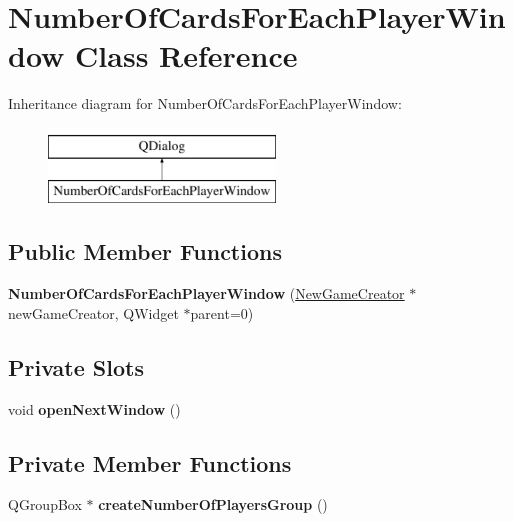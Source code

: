 \hypertarget{classNumberOfCardsForEachPlayerWindow}{}\section{Number\+Of\+Cards\+For\+Each\+Player\+Window Class Reference}
\label{classNumberOfCardsForEachPlayerWindow}
Inheritance diagram for Number\+Of\+Cards\+For\+Each\+Player\+Window\+:\begin{figure}[H]
\begin{center}
\leavevmode
\includegraphics[height=2.000000cm]{classNumberOfCardsForEachPlayerWindow}
\end{center}
\end{figure}
\subsection*{Public Member Functions}
\begin{DoxyCompactItemize}
\item 
\mbox{\label{classNumberOfCardsForEachPlayerWindow_aadd6710e807d6ac5a401c1ecbe51792b}} 
{\bfseries Number\+Of\+Cards\+For\+Each\+Player\+Window} (\hyperlink{classNewGameCreator}{New\+Game\+Creator} $\ast$new\+Game\+Creator, Q\+Widget $\ast$parent=0)
\end{DoxyCompactItemize}
\subsection*{Private Slots}
\begin{DoxyCompactItemize}
\item 
\mbox{\label{classNumberOfCardsForEachPlayerWindow_a0f9c2e3e60b2833382ebed28944666ee}} 
void {\bfseries open\+Next\+Window} ()
\end{DoxyCompactItemize}
\subsection*{Private Member Functions}
\begin{DoxyCompactItemize}
\item 
\mbox{\label{classNumberOfCardsForEachPlayerWindow_ac88a653ee30726209ba3b7e97095f091}} 
Q\+Group\+Box $\ast$ {\bfseries create\+Number\+Of\+Players\+Group} ()
\end{DoxyCompactItemize}
